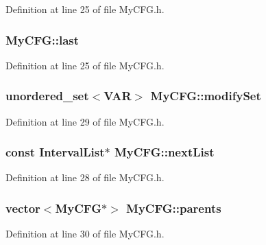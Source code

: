 Definition at line 25 of file My\-C\-F\-G.\-h.

\hypertarget{class_my_c_f_g_a8e650359861450173aa5b3c80485b3f8}{
\subsubsection[{last}]{ My\-C\-F\-G\-::last}}\label{class_my_c_f_g_a8e650359861450173aa5b3c80485b3f8}


Definition at line 25 of file My\-C\-F\-G.\-h.

\hypertarget{class_my_c_f_g_ab9f418af86a1491ca74a50135211b47d}{
\subsubsection[{modify\-Set}]{\setlength{\rightskip}{0pt plus 5cm}unordered\-\_\-set$<${\bf V\-A\-R}$>$ My\-C\-F\-G\-::modify\-Set}}\label{class_my_c_f_g_ab9f418af86a1491ca74a50135211b47d}


Definition at line 29 of file My\-C\-F\-G.\-h.

\hypertarget{class_my_c_f_g_a00af5ab7f113380ef1ddaca24e204086}{
\subsubsection[{next\-List}]{\setlength{\rightskip}{0pt plus 5cm}const {\bf Interval\-List}$\ast$ My\-C\-F\-G\-::next\-List}}\label{class_my_c_f_g_a00af5ab7f113380ef1ddaca24e204086}


Definition at line 28 of file My\-C\-F\-G.\-h.

\hypertarget{class_my_c_f_g_a0c76c679c9387cd2e41ad266459d92e5}{
\subsubsection[{parents}]{\setlength{\rightskip}{0pt plus 5cm}vector$<${\bf My\-C\-F\-G}$\ast$$>$ My\-C\-F\-G\-::parents}}\label{class_my_c_f_g_a0c76c679c9387cd2e41ad266459d92e5}


Definition at line 30 of file My\-C\-F\-G.\-h.


